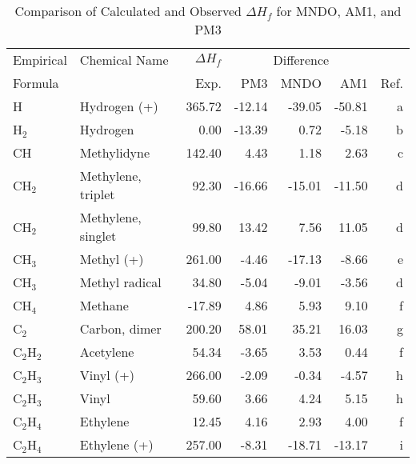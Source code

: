 \begin{table}
\caption{\label{hoftab} Comparison of Calculated and Observed $\Delta H_f$ 
for MNDO, AM1, and PM3}
\begin{center}
\compresstable
\begin{tabular}{llrrrrr}
Empirical & Chemical Name & $\Delta H_f$ & \multicolumn{3}{c}{Difference} & \\
Formula   &               & Exp. & PM3 &  MNDO  &  AM1 &     Ref.\\
\hline

 H           & Hydrogen (+)                   &   365.72    &   -12.14  &   -39.05  &   -50.81  &      a\\
 H$_2$          & Hydrogen                       &     0.00    &   -13.39  &     0.72  &    -5.18  &      b\\
 CH          & Methylidyne                    &   142.40    &     4.43  &     1.18  &     2.63  &      c\\
 CH$_2$         & Methylene, triplet             &    92.30    &   -16.66  &   -15.01  &   -11.50  &      d\\
 CH$_2$         & Methylene, singlet             &    99.80    &    13.42  &     7.56  &    11.05  &      d\\
 CH$_3$         & Methyl (+)                     &   261.00    &    -4.46  &   -17.13  &    -8.66  &      e\\
 CH$_3$         & Methyl radical                 &    34.80    &    -5.04  &    -9.01  &    -3.56  &      d\\
 CH$_4$         & Methane                        &   -17.89    &     4.86  &     5.93  &     9.10  &      f\\
 C$_2$          & Carbon, dimer                  &   200.20    &    58.01  &    35.21  &    16.03  &      g\\
 C$_2$H$_2$        & Acetylene                      &    54.34    &    -3.65  &     3.53  &     0.44  &      f\\
 C$_2$H$_3$        & Vinyl (+)                      &   266.00    &    -2.09  &    -0.34  &    -4.57  &      h\\
 C$_2$H$_3$        & Vinyl                          &    59.60    &     3.66  &     4.24  &     5.15  &      h\\
 C$_2$H$_4$        & Ethylene                       &    12.45    &     4.16  &     2.93  &     4.00  &      f\\
 C$_2$H$_4$        & Ethylene (+)                   &   257.00    &    -8.31  &   -18.71  &   -13.17  &      i\\

\end{tabular}
\end{center}
\end{table}
